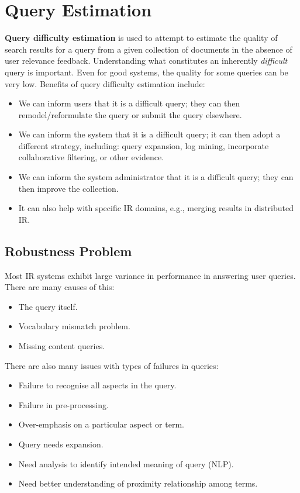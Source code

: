 \documentclass[a4paper,11pt]{article}
\begin{document}
\section{Query Estimation}
\textbf{Query difficulty estimation} is used to attempt to estimate the quality of search results for a query from a given collection of documents in the absence of user relevance feedback.
Understanding what constitutes an inherently \textit{difficult} query is important.
Even for good systems, the quality for some queries can be very low.
Benefits of query difficulty estimation include:
\begin{itemize}
    \item   We can inform users that it is a difficult query;
            they can then remodel/reformulate the query or submit the query elsewhere.
    \item   We can inform the system that it is a difficult query;
            it can then adopt a different strategy, including: query expansion, log mining, incorporate collaborative filtering, or other evidence.
    \item   We can inform the system administrator that it is a difficult query; they can then improve the collection.
    \item   It can also help with specific IR domains, e.g., merging results in distributed IR.
\end{itemize}

\subsection{Robustness Problem}
Most IR systems exhibit large variance in performance in answering user queries.
There are many causes of this:
\begin{itemize}
    \item   The query itself.
    \item   Vocabulary mismatch problem.
    \item   Missing content queries.
\end{itemize}

There are also many issues with types of failures in queries:
\begin{itemize}
    \item   Failure to recognise all aspects in the query.
    \item   Failure in pre-processing.
    \item   Over-emphasis on a particular aspect or term.
    \item   Query needs expansion.
    \item   Need analysis to identify intended meaning of query (NLP).
    \item   Need better understanding of proximity relationship among terms.
\end{itemize}
\end{document}
